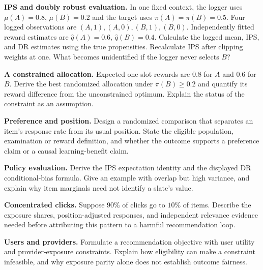\begin{exercises}
\item \textbf{IPS and doubly robust evaluation.} In one fixed context, the logger uses $\mu(A)=0.8$, $\mu(B)=0.2$ and the target uses $\pi(A)=\pi(B)=0.5$. Four logged observations are $(A,1),(A,0),(B,1),(B,0)$. Independently fitted reward estimates are $\widehat q(A)=0.6$, $\widehat q(B)=0.4$. Calculate the logged mean, IPS, and DR estimates using the true propensities. Recalculate IPS after clipping weights at one. What becomes unidentified if the logger never selects $B$?
\item \textbf{A constrained allocation.} Expected one-slot rewards are $0.8$ for $A$ and $0.6$ for $B$. Derive the best randomized allocation under $\pi(B)\ge0.2$ and quantify its reward difference from the unconstrained optimum. Explain the status of the constraint as an assumption.
\end{exercises}

\begin{challengeexercises}
\item \textbf{Preference and position.} Design a randomized comparison that separates an item's response rate from its usual position. State the eligible population, examination or reward definition, and whether the outcome supports a preference claim or a causal learning-benefit claim.
\item \textbf{Policy evaluation.} Derive the IPS expectation identity and the displayed DR conditional-bias formula. Give an example with overlap but high variance, and explain why item marginals need not identify a slate's value.
\item \textbf{Concentrated clicks.} Suppose $90\%$ of clicks go to $10\%$ of items. Describe the exposure shares, position-adjusted responses, and independent relevance evidence needed before attributing this pattern to a harmful recommendation loop.
\item \textbf{Users and providers.} Formulate a recommendation objective with user utility and provider-exposure constraints. Explain how eligibility can make a constraint infeasible, and why exposure parity alone does not establish outcome fairness.
\end{challengeexercises}

\clearpage
\begingroup\pagestyle{empty}\cleardoublepage\endgroup
\endgroup

